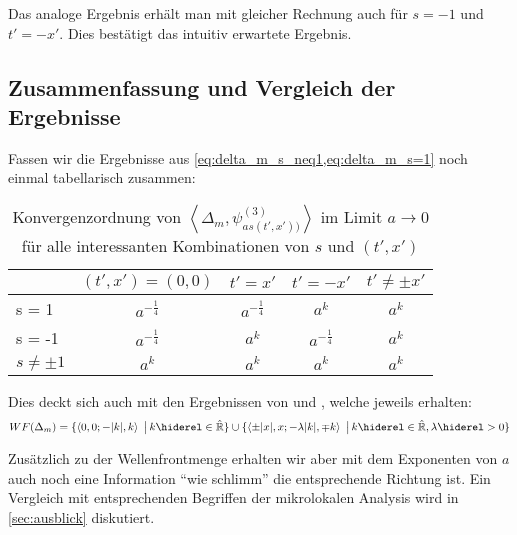 Das analoge Ergebnis erhält man mit gleicher Rechnung auch für $s=-1$ und $t' = -x'$.
Dies bestätigt das intuitiv erwartete Ergebnis.

\subsection{Zusammenfassung und Vergleich der Ergebnisse}
 Fassen wir die Ergebnisse aus
 \cref{eq:delta_m_s_neq1,eq:delta_m_s=1} noch einmal tabellarisch zusammen:

\begin{table}[h]
\centering
\begin{tabular}{l|cccc}
        & \multicolumn{1}{l}{$(t', x') = (0, 0)$} & \multicolumn{1}{l}{$t' = x'$} & \multicolumn{1}{l}{$t' = -x'$} & \multicolumn{1}{l}{$t' \neq \pm x'$} \\ \hline
s = 1   & $a^{-\frac{1}{4}}$    & $a^{-\frac{1}{4}}$    & $a^k$  & $a^k$    \\
s = -1  & $a^{-\frac{1}{4}}$    & $a^k$    & $a^{-\frac{1}{4}}$  & $a^k$    \\
$s \neq \pm 1$  & $a^k$         & $a^k$    & $a^k$               & $a^k$    \\
\end{tabular}
\caption{Konvergenzordnung von $\left<\Delta_m, \psi_{as(t',x'))}^{(3)}\right>$ im Limit $a \rightarrow 0$ für alle interessanten Kombinationen von $s$ und $(t',x')$}
\label{tab:wavefront_set_massive_two_point_function}
\end{table}


Dies deckt sich auch mit den Ergebnissen von \textcite{Schulz2014} und \textcite{Hoermander1985}, welche jeweils erhalten:
\begin{dmath*}
    WF(\Delta_m) =
    \{\left\langle 0,0; -|k|,k\right\rangle\ \big|\, k \hiderel\in \hat{\mathbb{R}}\}
    \cup
    \{\left\langle \pm |x|, x; -\lambda |k|,\mp k\right\rangle\ \big|\, k \hiderel\in \hat{\mathbb{R}}, \lambda \hiderel> 0\}
\end{dmath*}


Zusätzlich zu der Wellenfrontmenge erhalten wir aber mit dem Exponenten von $a$ auch noch eine Information "`wie schlimm"' die entsprechende Richtung ist. Ein Vergleich mit entsprechenden Begriffen der mikrolokalen Analysis wird in \cref{sec:ausblick} diskutiert.
